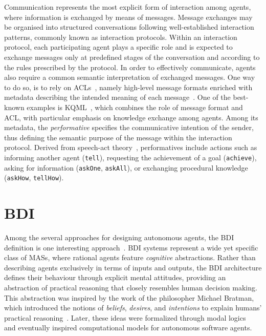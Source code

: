 Communication represents the most explicit form of interaction among agents, 
where information is exchanged by means of messages.
%
Message exchanges may be organised into structured conversations following well-established interaction patterns, 
commonly known as interaction protocols\footnotemark.
%
%
Within an interaction protocol, 
each participating agent plays a specific role 
and is expected to exchange messages only at predefined stages 
of the conversation and according to the rules prescribed by the protocol.
%
%
In order to effectively communicate,
agents also require a common semantic interpretation of exchanged messages.
%
One way to do so,
is to rely on \acp{ACL}~\cite{kone2000kais},
namely high-level message formats enriched with metadata describing the intended meaning of each message~\cite{Chaib-draaD02}.
%
One of the best-known examples is \ac{KQML}~\cite{finin1994KQML},
which combines the role of message format and \ac{ACL},
with particular emphasis on knowledge exchange among agents.
%
Among its metadata,
the \emph{performative} specifies the communicative intention of the sender,
thus defining the semantic purpose of the message within the interaction protocol.
%
Derived from speech-act theory~\cite{traum1999speech},
performatives include actions such as informing another agent
(\texttt{tell}),
requesting the achievement of a goal
(\texttt{achieve}),
asking for information
(\texttt{askOne}, \texttt{askAll}),
or exchanging procedural knowledge
(\texttt{askHow}, \texttt{tellHow}).

\section{BDI}
\label{sec:bdi}

Among the several approaches for designing autonomous agents,
the \ac{BDI} definition is one interesting approach~\cite{RaoG95}.
%
\ac{BDI} systems represent a wide yet specific class of \acp{MAS},
where rational agents feature \emph{cognitive} abstractions.
%
Rather than describing agents exclusively in terms of inputs and outputs,
the \ac{BDI} architecture defines their behaviour through explicit mental attitudes,
providing an abstraction of practical reasoning that closely resembles human decision making.
%
This abstraction was inspired by the work of the philosopher Michael Bratman,
which introduced the notions of
\emph{beliefs},
\emph{desires},
and
\emph{intentions}
to explain humans' practical reasoning~\cite{bratman1987intention}.
%
Later,
these ideas were formalized through modal logics~\cite{CohenL90}
and eventually inspired computational models for autonomous software agents.

